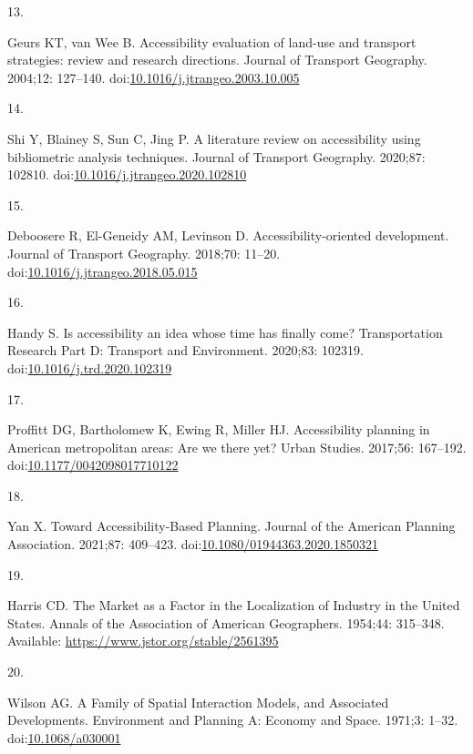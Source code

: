 \documentclass[10pt,letterpaper]{article}
\newlength{\cslhangindent}
\newlength{\csllabelwidth}
\newlength{\cslentryspacingunit} %
\newenvironment{CSLReferences}[2] %
 {%
  \setlength{\parindent}{0pt}
  \ifodd #1
  \let\oldpar\par
  \def\par{\hangindent=\cslhangindent\oldpar}
  \fi
  \setlength{\parskip}{#2\cslentryspacingunit}
 }%
 {}
\newcommand{\CSLLeftMargin}[1]{\parbox[t]{\csllabelwidth}{#1}}
\newcommand{\CSLRightInline}[1]{\parbox[t]{\linewidth - \csllabelwidth}{#1}\break}
\begin{document}
\begin{CSLReferences}{0}{0}
\leavevmode{}%
\CSLLeftMargin{13. }%
\CSLRightInline{Geurs KT, van Wee B. Accessibility evaluation of
land-use and transport strategies: review and research directions.
Journal of Transport Geography. 2004;12: 127--140.
doi:\href{https://doi.org/10.1016/j.jtrangeo.2003.10.005}{10.1016/j.jtrangeo.2003.10.005}}

\leavevmode{}%
\CSLLeftMargin{14. }%
\CSLRightInline{Shi Y, Blainey S, Sun C, Jing P. A literature review on
accessibility using bibliometric analysis techniques. Journal of
Transport Geography. 2020;87: 102810.
doi:\href{https://doi.org/10.1016/j.jtrangeo.2020.102810}{10.1016/j.jtrangeo.2020.102810}}

\leavevmode{}%
\CSLLeftMargin{15. }%
\CSLRightInline{Deboosere R, El-Geneidy AM, Levinson D.
Accessibility-oriented development. Journal of Transport Geography.
2018;70: 11--20.
doi:\href{https://doi.org/10.1016/j.jtrangeo.2018.05.015}{10.1016/j.jtrangeo.2018.05.015}}

\leavevmode{}%
\CSLLeftMargin{16. }%
\CSLRightInline{Handy S. Is accessibility an idea whose time has finally
come? Transportation Research Part D: Transport and Environment.
2020;83: 102319.
doi:\href{https://doi.org/10.1016/j.trd.2020.102319}{10.1016/j.trd.2020.102319}}

\leavevmode{}%
\CSLLeftMargin{17. }%
\CSLRightInline{Proffitt DG, Bartholomew K, Ewing R, Miller HJ.
Accessibility planning in American metropolitan areas: Are we there yet?
Urban Studies. 2017;56: 167--192.
doi:\href{https://doi.org/10.1177/0042098017710122}{10.1177/0042098017710122}}

\leavevmode{}%
\CSLLeftMargin{18. }%
\CSLRightInline{Yan X. Toward Accessibility-Based Planning. Journal of
the American Planning Association. 2021;87: 409--423.
doi:\href{https://doi.org/10.1080/01944363.2020.1850321}{10.1080/01944363.2020.1850321}}

\leavevmode{}%
\CSLLeftMargin{19. }%
\CSLRightInline{Harris CD. The {Market} as a {Factor} in the
{Localization} of {Industry} in the {United} {States}. Annals of the
Association of American Geographers. 1954;44: 315--348. Available:
\url{https://www.jstor.org/stable/2561395}}

\leavevmode{}%
\CSLLeftMargin{20. }%
\CSLRightInline{Wilson AG. A Family of Spatial Interaction Models, and
Associated Developments. Environment and Planning A: Economy and Space.
1971;3: 1--32.
doi:\href{https://doi.org/10.1068/a030001}{10.1068/a030001}}


\end{CSLReferences}
\end{document}
